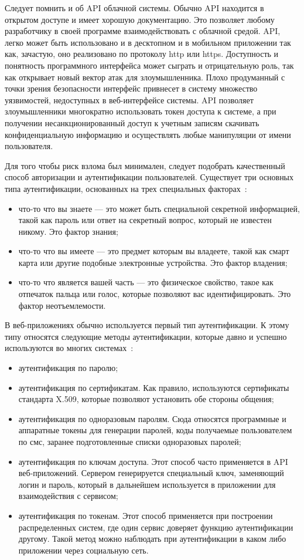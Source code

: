 Следует помнить и об API облачной системы. Обычно API находится в открытом доступе и имеет хорошую документацию. Это позволяет любому разработчику в своей программе взаимодействовать с облачной средой. API, легко может быть использовано и в десктопном и в мобильном приложении так как, зачастую, оно реализовано по протоколу http или https. Доступность и понятность программного интерфейса может сыграть и отрицательную роль, так как открывает новый вектор атак для злоумышленника. Плохо продуманный с точки зрения безопасности интерфейс привнесет в систему множество уязвимостей, недоступных в веб-интерфейсе системы. API позволяет злоумышленники многократно использовать токен доступа к системе, а при получении несанкционированный доступ к учетным записям скачивать конфиденциальную информацию и осуществлять любые манипуляции от имени пользователя.

Для того чтобы риск взлома был минимален, следует подобрать качественный способ авторизации и аутентификации пользователей. Существует три основных типа аутентификации, основанных на трех специальных факторах~\cite{pandya2015overview}:

\begin{itemize}
	\item что-то что вы знаете --- это может быть специальной секретной информацией, такой как пароль или ответ на секретный вопрос, который не известен никому. Это фактор знания;
	\item что-то что вы имеете --- это предмет которым вы владеете, такой как смарт карта или другие подобные электронные устройства. Это фактор владения;
	\item что-то что является вашей часть --- это физическое свойство, такое как отпечаток пальца или голос, которые позволяют вас идентифицировать. Это фактор неотъемлемости.
\end{itemize}

В веб-приложениях обычно используется первый тип аутентификации. К этому типу относятся следующие методы аутентификации, которые давно и успешно используются во многих системах~\cite{DataArt}:

\begin{itemize}
	\item аутентификация по паролю;
	\item аутентификация по сертификатам. Как правило, используются сертификаты стандарта X.509, которые позволяют установить обе стороны общения;
	\item аутентификация по одноразовым паролям. Сюда относятся программные и аппаратные токены для генерации паролей, коды получаемые пользователем по смс, заранее подготовленные списки одноразовых паролей;
	\item аутентификация по ключам доступа. Этот способ часто применяется в API веб-приложений. Сервером генерируется специальный ключ, заменяющий логин и пароль, который в дальнейшем используется в приложении для взаимодействия с сервисом;
	\item аутентификация по токенам. Этот способ применяется при построении распределенных систем, где один сервис доверяет функцию аутентификации другому. Такой метод можно наблюдать при аутентификации в каком либо приложении через социальную сеть.
\end{itemize}

